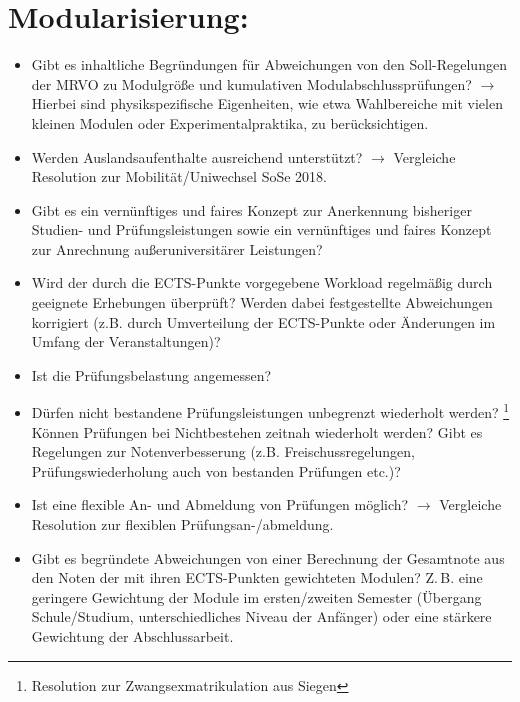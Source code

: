 \documentclass[DIV=calc]{scrartcl}
\begin{document}
	\section{Modularisierung:}
	\begin{itemize}
		\item Gibt es inhaltliche Begründungen für Abweichungen von den
		Soll-Regelungen der MRVO zu Modulgröße und kumulativen
		Modulabschlussprüfungen? $\rightarrow$ Hierbei sind physikspezifische
		Eigenheiten, wie etwa Wahlbereiche mit vielen kleinen Modulen oder
		Experimentalpraktika, zu berücksichtigen.
		\item Werden Auslandsaufenthalte ausreichend unterstützt? $\rightarrow$
		Vergleiche Resolution zur Mobilität/Uniwechsel SoSe
		2018.
		\item Gibt es ein vernünftiges und faires Konzept zur
		Anerkennung bisheriger Studien- und
		Prüfungsleistungen sowie ein vernünftiges und faires Konzept
			zur Anrechnung außeruniversitärer Leistungen?
		\item Wird der durch die ECTS-Punkte vorgegebene Workload regelmäßig
		durch geeignete Erhebungen überprüft? Werden dabei festgestellte
		Abweichungen korrigiert (z.B. durch Umverteilung der ECTS-Punkte oder
		Änderungen im Umfang der Veranstaltungen)?
		\item Ist die Prüfungsbelastung angemessen?
		\item Dürfen nicht bestandene Prüfungsleistungen unbegrenzt wiederholt werden? \footnote{Resolution zur Zwangsexmatrikulation aus Siegen} Können Prüfungen bei Nichtbestehen
		zeitnah wiederholt werden? Gibt es Regelungen zur Notenverbesserung
		(z.B. Freischussregelungen, Prüfungswiederholung auch von bestanden
		Prüfungen etc.)?
		\item Ist eine flexible An- und Abmeldung von Prüfungen möglich?
		$\rightarrow$ Vergleiche Resolution zur flexiblen
		Prüfungsan-/abmeldung.
		\item Gibt es begründete Abweichungen von einer Berechnung der
		Gesamtnote aus den Noten der mit ihren ECTS-Punkten gewichteten Modulen?
		Z.\,B. eine geringere Gewichtung der Module im ersten/zweiten Semester
		(Übergang Schule/Studium, unterschiedliches Niveau der Anfänger) oder
		eine stärkere Gewichtung der Abschlussarbeit.
	\end{itemize}
\end{document}
